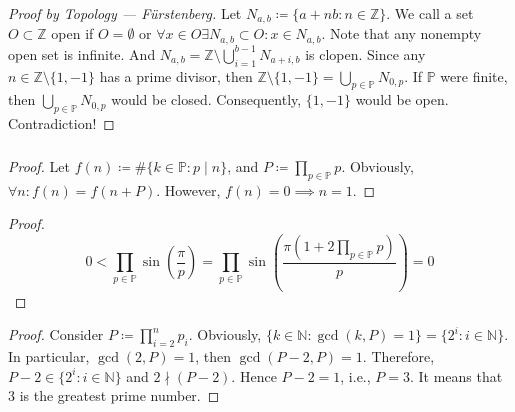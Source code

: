 \documentclass[UTF8,aspectratio=43,11pt,colorlinks,compress,openany]{beamer}%
\begin{document}
\begin{frame}\frametitle{}
\begin{proof}[Proof by Topology --- F\"urstenberg]
Let $N_{a,b}\coloneqq \{a+nb: n\in\mathbb{Z}\}$. We call a set $O\subset\mathbb{Z}$ open if $O=\emptyset$ or $\forall x\in O\exists N_{a,b}\subset O: x \in N_{a,b}$. Note that any nonempty open set is infinite. And $N_{a,b}=\mathbb{Z}\setminus\bigcup_{i=1}^{b-1}N_{a+i,b}$ is clopen. Since any $n\in\mathbb{Z}\setminus\{1,-1\}$ has a prime divisor, then $\mathbb{Z}\setminus\{1,-1\}=\bigcup_{p \in\mathbb{P}}N_{0,p}$. If $\mathbb{P}$ were finite, then $\bigcup_{p \in\mathbb{P}}N_{0,p}$ would be closed. Consequently, $\{1,-1\}$ would be open. Contradiction!
\end{proof}
\end{frame}

\begin{frame}\frametitle{}
\begin{proof}
Let $f(n)\coloneqq \#\{k\in\mathbb{P}: p\mid n\}$, and $P\coloneqq \prod\limits_{p\in\mathbb{P}} p$. Obviously, $\forall n: f(n)=f(n+P)$. However, $f(n)=0\implies n=1$.
\end{proof}
\begin{proof}
\[0<\prod\limits_{p\in\mathbb{P}}\sin\left(\frac{\pi}{p}\right)=\prod\limits_{p\in\mathbb{P}}\sin\left(\frac{\pi\left(1+2\prod\limits_{p\in\mathbb{P}}p\right)}{p}\right)=0\]
\end{proof}
\begin{proof}
Consider $P\coloneqq \prod\limits_{i=2}^n p_i$. Obviously, $\{k\in\mathbb{N}: \gcd(k,P)=1\}=\{2^i: i\in\mathbb{N}\}$. In particular, $\gcd(2,P)=1$, then $\gcd(P-2,P)=1$. Therefore, $P-2\in\{2^i: i\in\mathbb{N}\}$ and $2\nmid(P-2)$. Hence $P-2=1$, i.e., $P=3$. It means that $3$ is the greatest prime number.
\end{proof}
\end{frame}
\end{document}

